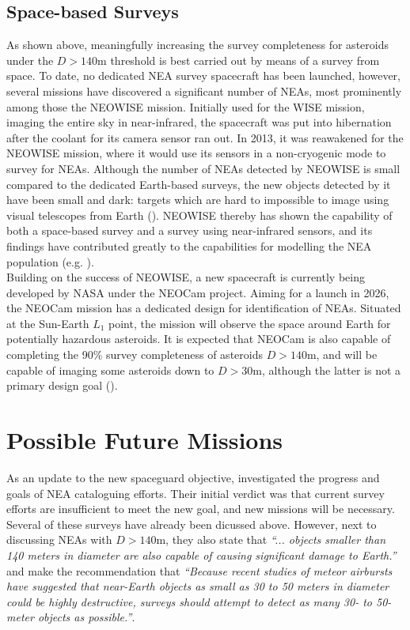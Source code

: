 \subsection{Space-based Surveys}
As shown above, meaningfully increasing the survey completeness for asteroids under the $D > 140 \mathrm{m}$ threshold is best carried out by means of a survey from space. To date, no dedicated NEA survey spacecraft has been launched, however, several missions have discovered a significant number of NEAs, most prominently among those the NEOWISE mission. Initially used for the WISE mission, imaging the entire sky in near-infrared, the spacecraft was put into hibernation after the coolant for its camera sensor ran out. In 2013, it was reawakened for the NEOWISE mission, where it would use its sensors in a non-cryogenic mode to survey for NEAs. Although the number of NEAs detected by NEOWISE is small compared to the dedicated Earth-based surveys, the new objects detected by it have been small and dark: targets which are hard to impossible to image using visual telescopes from Earth (\cite{NEOWISEResult}). NEOWISE thereby has shown the capability of both a space-based survey and a survey using near-infrared sensors, and its findings have contributed greatly to the capabilities for modelling the NEA population (e.g. \cite{GranvikPopulation}).\\

Building on the success of NEOWISE, a new spacecraft is currently being developed by NASA under the NEOCam project. Aiming for a launch in 2026, the NEOCam mission has a dedicated design for identification of NEAs. Situated at the Sun-Earth $L_1$ point, the mission will observe the space around Earth for potentially hazardous asteroids. It is expected that NEOCam is also capable of completing the 90\% survey completeness of asteroids $D > 140 \mathrm{m}$, and will be capable of imaging some asteroids down to $D > 30 \mathrm{m}$, although the latter is not a primary design goal (\cite{NEOCam}).

\section{Possible Future Missions}
\label{sec:introductionproposals}
As an update to the new spaceguard objective, \cite{DefendingEarth} investigated the progress and goals of NEA cataloguing efforts. Their initial verdict was that current survey efforts are insufficient to meet the new goal, and new missions will be necessary. Several of these surveys have already been dicussed above. However, next to discussing NEAs with $D > 140 \mathrm{m}$, they also state that \textit{``... objects smaller than 140 meters in diameter are also capable of causing significant damage to Earth.''} and make the recommendation that \textit{``Because recent studies of meteor airbursts have suggested that near-Earth objects as small as 30 to 50 meters in diameter could be highly destructive, surveys should attempt to detect as many 30- to 50-meter objects as possible.''}. \\

